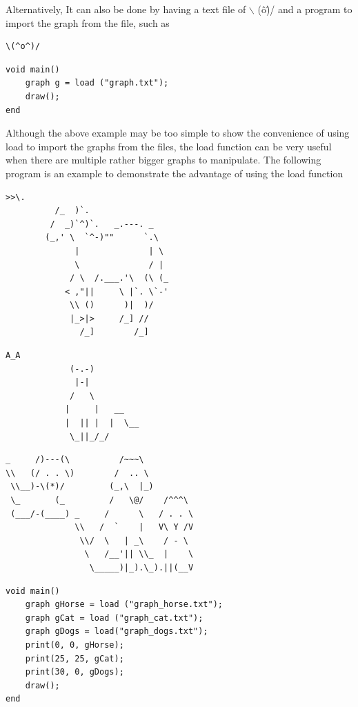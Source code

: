\documentclass[11pt,letterpaper]{article}
\begin{document}
Alternatively, It can also be done by having a text file of $\backslash$ (\^o\^)/ and a program to import the graph from the file, such as

\begin{lstlisting}[caption=graph.txt, label=hail_face, captionpos=b, tabsize=4]
						\(^o^)/
\end{lstlisting}

\begin{lstlisting}[caption=hailv2.adl, label=hailv2, captionpos=b, tabsize=4, frame=single]
void main()
	graph g = load ("graph.txt");
	draw();
end
\end{lstlisting}

Although the above example may be too simple to show the convenience of using load to import the graphs from the files, the load function can be very useful when there are multiple rather bigger graphs to manipulate. The following program is an example to demonstrate the advantage of using the load function
\pagebreak
\begin{lstlisting}[caption=graph\_horse.txt, label=horse, captionpos=b]
		   >>\.
		  /_  )`.
		 /  _)`^)`.   _.---. _
		(_,' \  `^-)""      `.\
		      |              | \
		      \              / |
		     / \  /.___.'\  (\ (_
		    < ,"||     \ |`. \`-'
		     \\ ()      )|  )/
		     |_>|>     /_] //
		       /_]        /_]
\end{lstlisting}

\begin{lstlisting}[caption=graph\_cat.txt, label=cat, captionpos=b]
			  A_A
			 (-.-)
			  |-|
			 /   \
			|     |   __
			|  || |  |  \__
			 \_||_/_/
\end{lstlisting}

\begin{lstlisting}[caption=graph\_dogs.txt, label=dogs, captionpos=b]
_     /)---(\          /~~~\
\\   (/ . . \)        /  .. \
 \\__)-\(*)/         (_,\  |_)
 \_       (_         /   \@/    /^^^\
 (___/-(____) _     /      \   / . . \
              \\   /  `    |   V\ Y /V
               \\/  \   | _\    / - \
                \   /__'|| \\_  |    \
                 \_____)|_).\_).||(__V
\end{lstlisting}

\begin{lstlisting}[caption=animals.adl, label=animal, captionpos=b, tabsize=4, frame=single]
void main()
	graph gHorse = load ("graph_horse.txt");
	graph gCat = load ("graph_cat.txt");
	graph gDogs = load("graph_dogs.txt");
	print(0, 0, gHorse);
	print(25, 25, gCat);
	print(30, 0, gDogs);
	draw();
end
\end{lstlisting}
\end{document}
